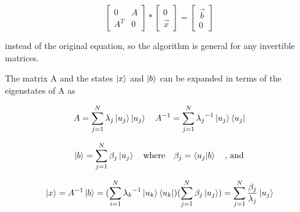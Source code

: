 \documentclass[11pt]{article}
\begin{document}
\[
\begin{bmatrix}
0 & A\\
A^{T} & 0
\end{bmatrix}
*
\begin{bmatrix}
0 \\ \vec{x}
\end{bmatrix}
=
\begin{bmatrix} 
\vec{b} \\ 0
\end{bmatrix}
\]

instead of the original equation, so the algorithm is general for any invertible matrices. 

The matrix A and the states $\ket{x}$ and $\ket{b}$ can be expanded in terms of the eigenstates of A as 

$$A = \sum_{j=1}^{N} \lambda_{j} \ket{u_{j}} \ket{u_{j}} \quad
A^{-1} = \sum_{j=1}^{N} {\lambda_{j}}^{-1} \ket{u_{j}} \bra{u_{j}}$$

$$\ket{b} = \sum_{j=1}^{N} \beta_{j} \ket{u_{j}} \quad \text{where} \quad \beta_{j} = \bra{u_{j}}\ket{b} \quad \text{, and}$$

$$\ket{x} = A^{-1} \ket{b} = (\sum_{i=1}^{N} {\lambda_{k}}^{-1} \ket{u_{k}} \bra{u_{k}} ) (\sum_{j = 1}^{N} \beta_{j} \ket{u_{j}} ) = \sum_{j = 1}^{N} \frac{\beta_{j}}{\lambda_{j}} \ket{u_{j}}$$
\end{document}
